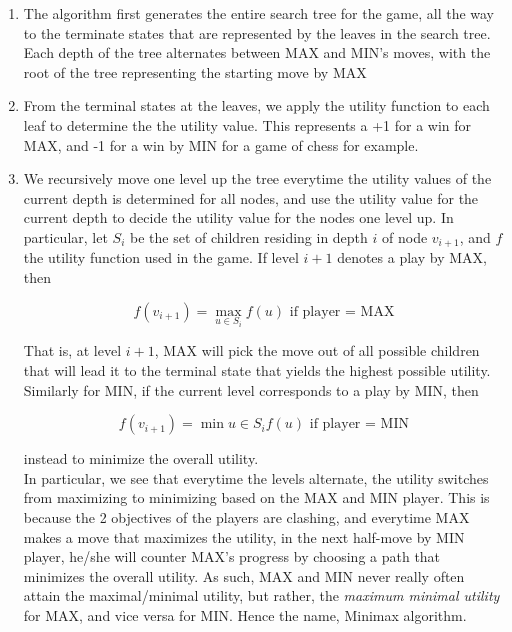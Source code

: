 \documentclass[12pt]{article}
\begin{document}
\begin{enumerate}
\item The algorithm first generates the entire search tree for the game, all the way to the terminate states that are represented by the leaves in the search tree. Each depth of the tree alternates between MAX and MIN's moves, with the root of the tree representing the starting move by MAX

\item From the terminal states at the leaves, we apply the utility function to each leaf to determine the the utility value. This represents a +1 for a win for MAX, and -1 for a win by MIN for a game of chess for example.

\item We recursively move one level up the tree everytime the utility values of the current depth is determined for all nodes, and use the utility value for the current depth to decide the utility value for the nodes one level up. In particular, let $S_i$ be the set of children residing in depth $i$ of node $v_{i+1}$, and $f$ the utility function used in the game. If level $i+1$ denotes a play by MAX, then 

\begin{equation*}
f(v_{i+1}) = \max_{u \in S_i} f(u) \text{ if player = MAX}
\end{equation*}

That is, at level $i+1$, MAX will pick the move out of all possible children that will lead it to the terminal state that yields the highest possible utility. Similarly for MIN, if the current level corresponds to a play by MIN, then 

\begin{equation*}
f(v_{i+1}) = \min{u \in S_i} f(u) \text{ if player = MIN}
\end{equation*}

instead to minimize the overall utility.\\

In particular, we see that everytime the levels alternate, the utility switches from maximizing to minimizing based on the MAX and MIN player. This is because the 2 objectives of the players are clashing, and everytime MAX makes a move that maximizes the utility, in the next half-move by MIN player, he/she will counter MAX's progress by choosing a path that minimizes the overall utility. As such, MAX and MIN never really often attain the maximal/minimal utility, but rather, the \textit{maximum minimal utility} for MAX, and vice versa for MIN. Hence the name, Minimax algorithm.
\end{enumerate}
\end{document}
